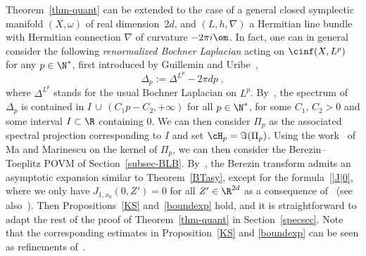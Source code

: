 \begin{rema}
Theorem~\ref{thm-quant} can be extended to the case of a general closed symplectic manifold $(X,\omega)$ of real dimension~$2d$, and $(L,h,\nabla)$ a Hermitian line bundle with Hermitian connection $\nabla$ of curvature $-2\pi i\om$. In fact, one can in general consider the following
\emph{renormalized Bochner Laplacian} acting on $\cinf(X,L^p)$ for any $p\in\N^*$, first introduced by Guillemin and Uribe~\cite{GU88},
\begin{equation}
\Delta_p:=\Delta^{L^p}-2\pi dp\;,
\end{equation}
where $\Delta^{L^p}$ stands for the usual Bochner Laplacian on $L^p$. By~\cite[Theorem~2.a]{GU88}, the spectrum of $\Delta_p$ is contained in $I\,\cup\,(C_1p-C_2,+\infty)$ for all $p\in\N^*$, for some $C_1,\,C_2>0$ and some interval $I\subset\R$ containing $0$. We can then consider $\Pi_p$ as the associated spectral projection corresponding to $I$ and set $\cH_p=\Im(\Pi_p)$. Using the work~\cite{MM08} of Ma and Marinescu on the kernel of $\Pi_p$, we can then consider the Berezin--Toeplitz POVM of Section~\ref{subsec-BLB}. By~\cite[(2.31),~(3.2)]{LMM16}, the Berezin transform admits an asymptotic expansion similar to Theorem~\ref{BTasy}, except for the formula~\eqref{|J|0}, where we only have $J_{1,x_0}(0,Z')=0$ for all $Z'\in\R^{2d}$ as a consequence of~\cite[Lemma~6.1, Lemma~6.2]{ILMM17} (see also~\cite[(2.32)]{MM08}). Then Propositions~\ref{KS} and~\ref{boundexp} hold, and it is straightforward to adapt the rest of the proof of Theorem~\ref{thm-quant} in Section~\ref{specsec}. Note that the corresponding estimates in Proposition~\ref{KS} and
\ref{boundexp} can be seen as refinements of~\cite{LMM16}.
\end{rema}

